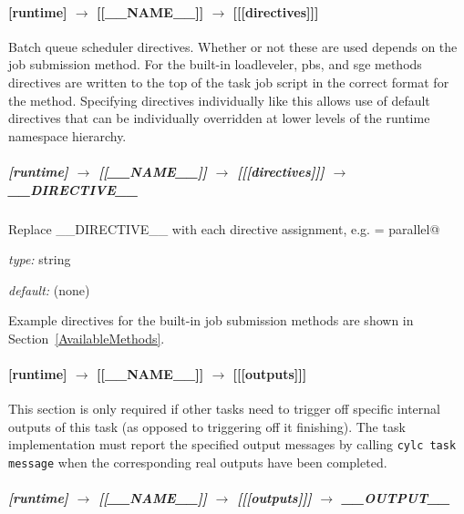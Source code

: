 \paragraph[{[[[}directives{]]]}]{[runtime] $\rightarrow$ [[\_\_NAME\_\_]] $\rightarrow$ [[[directives]]]}

Batch queue scheduler directives.  Whether or not these are used depends
on the job submission method. For the built-in loadleveler, pbs, and sge
methods directives are written to the top of the task job script in
the correct format for the method. Specifying directives individually
like this allows use of default directives that can be individually
overridden at lower levels of the runtime namespace hierarchy.

\subparagraph[\_\_DIRECTIVE\_\_ ]{[runtime] $\rightarrow$ [[\_\_NAME\_\_]] $\rightarrow$ [[[directives]]] $\rightarrow$ \_\_DIRECTIVE\_\_}

Replace \_\_DIRECTIVE\_\_ with each directive assignment, e.g. 
\lstinline@class = parallel@

\begin{myitemize}
\item {\em type:} string
\item {\em default:} (none)
\end{myitemize}

Example directives for the built-in job submission methods are shown in
Section~\ref{AvailableMethods}.

\paragraph[{[[[}outputs{]]]}]{[runtime] $\rightarrow$ [[\_\_NAME\_\_]] $\rightarrow$ [[[outputs]]]}

This section is only required if other tasks need to trigger off specific
internal outputs of this task (as opposed to triggering off it finishing).
The task implementation must report the specified output messages 
by calling \lstinline=cylc task message= when the
corresponding real outputs have been completed.

\subparagraph[\_\_OUTPUT\_\_ ]{[runtime] $\rightarrow$ [[\_\_NAME\_\_]] $\rightarrow$ [[[outputs]]] $\rightarrow$ \_\_OUTPUT\_\_}

